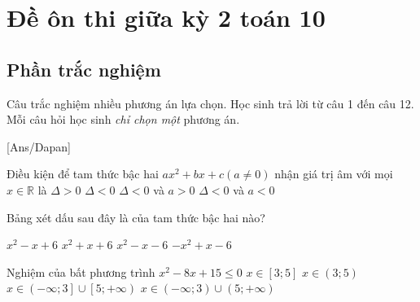 \section{Đề ôn thi giữa kỳ 2 toán 10}
\subsection{Phần trắc nghiệm}
Câu trắc nghiệm nhiều phương án lựa chọn. Học sinh trả lời từ
câu 1 đến câu 12. Mỗi câu hỏi học sinh \textit{chỉ chọn một} phương án.

[Ans/Dapan]
 
\hienthiloigiaiex
\begin{ex}%
	Điều kiện để tam thức bậc hai $a x^2+b x+c(a \neq 0)$ nhận giá trị âm với mọi $x \in \mathbb{R}$ là
	\choice
	{$\Delta>0$
	}{$\Delta<0$
	}{$\Delta<0$ và $a>0$
	}{\True $\Delta<0$ và $a<0$}
\end{ex}
\begin{ex}%
	Bảng xét dấu sau đây là của tam thức bậc hai nào?
	
	\begin{center}
	\end{center}
	
	\choice
	{$x^2-x+6$
	}{$x^2+x+6$
	}{\True $x^2-x-6$
	}{$-x^2+x-6$}
\end{ex}
\begin{ex}%
	Nghiệm của bất phương trình $x^2-8x+15 \leq 0$
	\choice
	{\True $x \in \left[3;5\right]$}
	{$x \in \left(3;5\right)$}
	{$x \in \left(-\infty;3\right] \cup \left[5;+\infty\right)$}
	{$x \in \left(-\infty;3\right) \cup \left(5;+\infty\right)$}
\end{ex}
